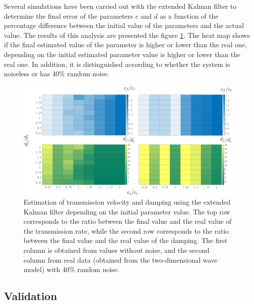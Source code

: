 \documentclass[12pt, a4paper]{article} %
\begin{document}
Several simulations have been carried out with the extended Kalman filter to determine the final error of the parameters $c$ and $d$ as a function of the percentage difference between the initial value of the parameters and the actual value. The results of this analysis are presented the figure \ref{fig:valorescd}. The heat map shows if the final estimated value of the parameter is higher or lower than the real one, depending on the initial estimated parameter value is higher or lower than the real one. In addition, it is distinguished according to whether the system is noiseless or has 40\% random noise.

\begin{figure}[h!]
    \centering
    \includegraphics[width=1\textwidth]{figures/dependencia_valores_iniciales_1.png}
    \caption{Estimation of  transmission velocity and damping using the extended Kalman filter depending on the initial parameter value. The top row corresponds to the ratio between the final value and the real value of the transmission rate, while the second row corresponds to the ratio between the final value and the real value of the damping. The first column is obtained from values without noise, and the second column from real data (obtained from the two-dimensional wave model) with 40\% random noise.}
    \label{fig:valorescd}
\end{figure}

\newpage

\setlength{\parskip}{0mm}

\subsection{Validation}
\end{document}
